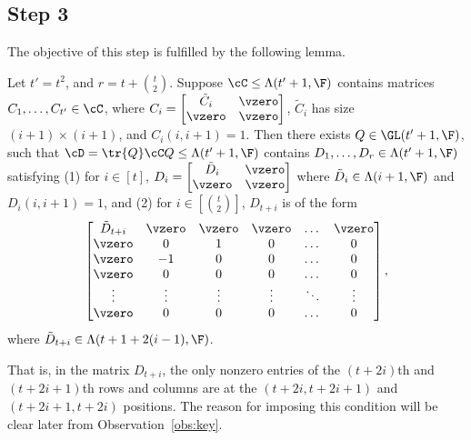 \subsection{Step 3} The objective of this step is fulfilled by the following 
lemma. 
\begin{lemma}\label{lem:step3}
Let $t'=t^2$, and $r=t+\binom{t}{2}$. 
Suppose $\cC\leq 
\Lambda(t'+1, \F)$ contains matrices $C_1, \dots, C_{t'}\in \cC$, where
$C_i=\begin{bmatrix}
\tilde C_i & \vzero \\
\vzero & \vzero 
\end{bmatrix}$, $\tilde C_i$ has size $(i+1)\times (i+1)$, and $C_i(i, 
i+1)=1$.
Then there exists $Q\in\GL(t'+1, \F)$, such that $\cD=\tr{Q}\cC Q\leq 
\Lambda(t'+1, 
\F)$ contains 
$D_1, 
\dots, D_r\in \Lambda(t'+1, \F)$ satisfying (1) for $i\in [t]$, 
$D_i=\begin{bmatrix}
\tilde D_i & \vzero \\
\vzero & \vzero 
\end{bmatrix}$ where $\tilde D_i\in \Lambda(i+1, \F)$ and $D_i(i, i+1)=1$, 
and 
(2) for 
$i\in[\binom{t}{2}]$, $D_{t+i}$ is of the form
%
%
%
%
%
%
\begin{equation}\label{eq:form_of_D}
\begin{bmatrix}
\tilde D_{t+i} & \vzero & \vzero & \vzero & \dots & \vzero \\
\vzero & 0 & 1 & 0 & \dots & 0 \\
\vzero & -1 & 0 & 0 & \dots & 0 \\
\vzero & 0 & 0 & 0 & \dots & 0 \\
\vdots & \vdots & \vdots & \vdots & \ddots & \vdots \\
\vzero & 0 & 0 & 0 & \dots & 0 
\end{bmatrix}, 
\end{equation}
where $\tilde D_{t+i}\in\Lambda(t+1+2(i-1), \F)$. 
\end{lemma}

That is, in the matrix $D_{t+i}$, the only nonzero 
entries 
of the $(t+2i)$th and $(t+2i+1)$th rows and columns are at the $(t+2i, t+2i+1)$ 
and $(t+2i+1, t+2i)$ positions. The reason for imposing this condition will be 
clear later from Observation~\ref{obs:key}.


